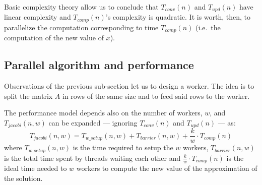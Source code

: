 Basic complexity theory allow us to conclude that $T_{conv}(n)$ and $T_{upd}(n)$ have linear complexity and $T_{comp}(n)$'s complexity is quadratic.
It is worth, then, to parallelize the computation corresponding to time $T_{comp}(n)$ (i.e.\ the computation of the new value of $x$).

\subsection{Parallel algorithm and performance}\label{subsec:par}
Observations of the previous sub-section let us to design a worker.
The idea is to split the matrix $A$ in rows of the same size and to feed said rows to the worker.

The performance model depends also on the number of workers, $w$, and $ T_{jacobi}(n, w)$ can be expanded --- ignoring $T_{conv}(n)$ and $T_{upd}(n)$ --- as:
\[
	 T_{jacobi}(n, w) = T_{w\_setup} (n, w) + T_{barrier} (n, w) + \frac{k}{w} \cdot T_{comp}(n)
\]
where $T_{w\_setup} (n, w)$ is the time required to setup the $w$ workers, $T_{barrier} (n, w)$ is the total time spent by threads waiting each other and $\frac{k}{w} \cdot T_{comp}(n)$ is the ideal time needed to $w$ workers to compute the new value of the approximation of the solution.